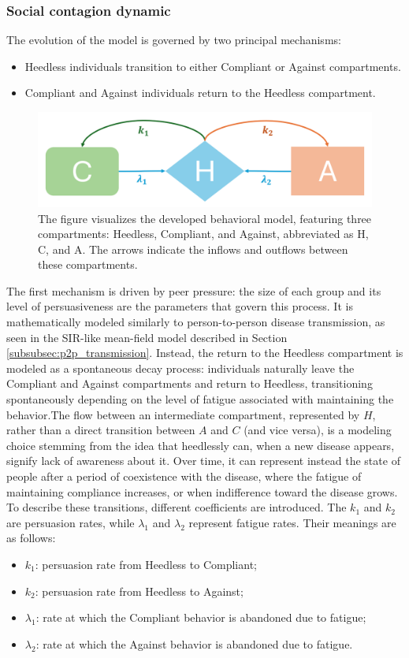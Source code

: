 \subsubsection{Social contagion dynamic}
The evolution of the model is governed by two principal mechanisms: \begin{itemize} 
	\item Heedless individuals transition to either Compliant or Against compartments. 
	\item Compliant and Against individuals return to the Heedless compartment. 
\end{itemize}
\begin{figure}[ht]
	\centering
	\includegraphics[width=0.72\linewidth]{1_corpo/figure/behavior_model_figure}
	\caption[Behavior model]{The figure visualizes the developed behavioral model, featuring three compartments: Heedless, Compliant, and Against, abbreviated as H, C, and A. The arrows indicate the inflows and outflows between these compartments.}
	\label{fig:behaviormodelfigure}
\end{figure}
The first mechanism is driven by peer pressure: the size of each group and its level of persuasiveness are the parameters that govern this process. It is mathematically modeled similarly to person-to-person disease transmission, as seen in the SIR-like mean-field model described in Section \ref{subsubsec:p2p_transmission}. Instead, the return to the Heedless compartment is modeled as a spontaneous decay process: individuals naturally leave the Compliant and Against compartments and return to Heedless, transitioning spontaneously depending on the level of fatigue associated with maintaining the behavior.The flow between an intermediate compartment, represented by $H$, rather than a direct transition between $A$ and $C$ (and vice versa), is a modeling choice stemming from the idea that heedlessly can, when a new disease appears, signify lack of awareness about it. Over time, it can represent instead the state of people after a period of coexistence with the disease, where the fatigue of maintaining compliance increases, or when indifference toward the disease grows.
To describe these transitions, different coefficients are introduced. The $k_1$ and $k_2$ are persuasion rates, while $\lambda_1$ and $\lambda_2$ represent fatigue rates. Their meanings are as follows: \begin{itemize} 
	\item $k_1$: persuasion rate from Heedless to Compliant; 
	\item $k_2$: persuasion rate from Heedless to Against; 
	\item $\lambda_1$: rate at which the Compliant behavior is abandoned due to fatigue; 
	\item $\lambda_2$: rate at which the Against behavior is abandoned due to fatigue. 
\end{itemize}

